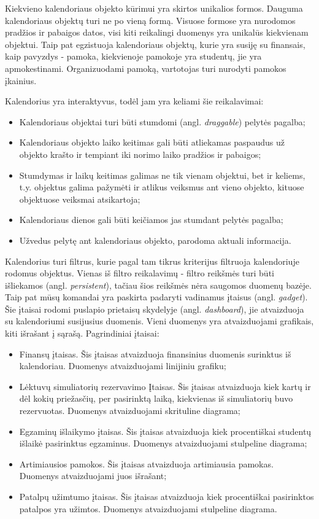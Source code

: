 \documentclass{VUMIFPSbakalaurinis}
\begin{document}
Kiekvieno kalendoriaus objekto kūrimui yra skirtos unikalios formos. Dauguma kalendoriaus objektų turi ne po vieną formą. Visuose formose yra nurodomos pradžios ir pabaigos datos, visi kiti reikalingi duomenys yra unikalūs kiekvienam objektui. Taip pat egzistuoja kalendoriaus objektų, kurie yra susiję su finansais, kaip pavyzdys - pamoka, kiekvienoje pamokoje yra studentų, jie yra apmokestinami. Organizuodami pamoką, vartotojas turi nurodyti pamokos įkainius.

Kalendorius yra interaktyvus, todėl jam yra keliami šie reikalavimai: 
\begin{itemize}
    \item Kalendoriaus objektai turi būti stumdomi (angl. \textit{draggable}) pelytės pagalba;
    \item Kalendoriaus objekto laiko keitimas gali būti atliekamas paspaudus už objekto krašto ir tempiant iki norimo laiko pradžios ir pabaigos;
    \item Stumdymas ir laikų keitimas galimas ne tik vienam objektui, bet ir keliems, t.y. objektus galima pažymėti ir atlikus veiksmus ant vieno objekto, kituose objektuose veiksmai atsikartoja;
    \item Kalendoriaus dienos gali būti keičiamos jas stumdant pelytės pagalba;
    \item Užvedus pelytę ant kalendoriaus objekto, parodoma aktuali informacija.
\end{itemize}

Kalendorius turi filtrus, kurie pagal tam tikrus kriterijus filtruoja kalendoriuje rodomus objektus. Vienas iš filtro reikalavimų - filtro reikšmės turi būti išliekamos (angl. \textit{persistent}), tačiau šios reikšmės nėra saugomos duomenų bazėje. Taip pat mūsų komandai yra paskirta padaryti vadinamus įtaisus (angl. \textit{gadget}). Šie įtaisai rodomi puslapio prietaisų skydelyje (angl. \textit{dashboard}), jie atvaizduoja su kalendoriumi susijusius duomenis. Vieni duomenys yra atvaizduojami grafikais, kiti išrašant į sąrašą. Pagrindiniai įtaisai:
\begin{itemize}
    \item Finansų įtaisas. Šis įtaisas atvaizduoja finansinius duomenis surinktus iš kalendoriau. Duomenys atvaizduojami linijiniu grafiku;
    \item Lėktuvų simuliatorių rezervavimo Įtaisas. Šis įtaisas atvaizduoja kiek kartų ir dėl kokių priežasčių, per pasirinktą laiką, kiekvienas iš simuliatorių buvo rezervuotas. Duomenys atvaizduojami skrituline diagrama;
    \item Egzaminų išlaikymo įtaisas. Šis įtaisas atvaizduoja kiek procentiškai studentų išlaikė pasirinktus egzaminus. Duomenys atvaizduojami stulpeline diagrama;
    \item Artimiausios pamokos. Šis įtaisas atvaizduoja artimiausia pamokas. Duomenys atvaizduojami juos išrašant;
    \item Patalpų užimtumo įtaisas. Šis įtaisas atvaizduoja kiek procentiškai pasirinktos patalpos yra užimtos. Duomenys atvaizduojami stulpeline diagrama.
\end{itemize}
\end{document}
